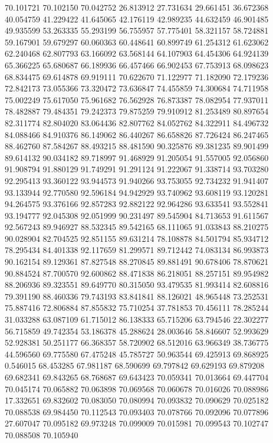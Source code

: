 70.101721
70.102150
70.042752
26.813912
27.731634
29.661451
36.672368
40.054759
41.229422
41.645065
42.176119
42.989235
44.632459
46.901485
49.935599
53.263335
55.293199
56.755957
57.775401
58.321157
58.724881
59.167901
59.679297
60.060363
60.448641
60.899749
61.254312
61.623062
62.240468
62.807793
63.166092
63.568144
64.107903
64.454306
64.924139
65.366225
65.680687
66.189936
66.457466
66.902453
67.753913
68.098623
68.834475
69.614878
69.919111
70.622670
71.122977
71.182090
72.179236
72.842173
73.055366
73.320472
73.636847
74.455859
74.300684
74.711958
75.002249
75.617050
75.961682
76.562928
76.873387
78.082954
77.937011
78.482887
79.484351
79.242373
79.875259
79.910912
81.253489
80.897654
82.311774
82.804020
83.064436
82.807762
84.052762
84.322911
84.496732
84.088466
84.910376
86.149062
86.440267
86.658826
87.726424
86.247465
88.462760
87.584267
88.493215
88.481590
90.325876
89.381235
89.901499
89.614132
90.034182
89.718997
91.468929
91.205054
91.557005
92.056860
91.908794
91.880129
91.749291
91.291124
91.222067
91.338714
93.703280
92.295413
93.360122
93.944573
91.940266
93.753055
92.734232
91.941407
93.133944
92.770580
92.596184
94.942929
93.740962
93.608119
93.120281
94.264575
93.376166
92.857283
92.882122
92.964286
93.633541
93.552841
93.194777
92.045308
92.051999
90.231497
89.545904
84.713653
91.611567
92.567243
89.946927
88.532345
89.542165
68.111065
91.033843
88.210275
90.028904
82.704525
92.851155
89.631214
78.108878
84.501794
85.934712
78.295434
84.401338
92.117659
81.299571
89.712442
74.083134
86.993873
90.162154
89.129361
87.827548
88.270845
89.881491
90.678406
78.870621
90.884524
87.700570
92.600862
88.471838
86.218051
88.257151
89.954982
88.206936
89.323551
89.649770
80.315050
93.479535
81.993414
82.608816
79.391190
88.460336
79.743193
83.841841
88.126021
48.965448
73.252531
75.887416
72.806884
87.855832
75.710254
37.781853
70.456111
78.285244
31.033288
63.087109
61.715012
86.138333
65.715206
63.794546
22.302277
56.715859
49.742354
53.186378
45.288624
28.003646
58.846607
52.993629
52.928381
50.251177
66.368357
58.720902
68.512016
63.966349
38.736775
44.596560
69.775580
67.475248
45.785727
50.963544
69.425913
69.868925
0.546015
68.453285
67.981187
68.590699
69.797842
69.629193
69.879208
69.682341
69.843265
68.768687
69.643423
70.059341
70.013664
69.447704
70.045174
70.065882
70.063898
70.069568
70.060678
70.016026
70.088986
17.332651
69.832602
70.083050
70.080994
70.093832
70.090629
70.025182
70.088538
69.984450
70.112543
70.093403
70.078766
70.092096
70.077896
27.607047
70.095182
69.973248
70.099009
70.015981
70.099543
70.102747
70.088508
70.105940
